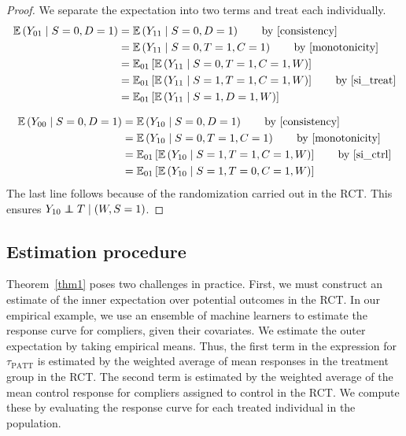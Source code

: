 \documentclass[12pt]{article}
\newcommand{\ex}{\mathbb{E}} %
\newcommand\independent{\protect\mathpalette{\protect\independenT}{\perp}}
\def\independenT#1#2{\mathrel{\rlap{$#1#2$}\mkern2mu{#1#2}}}
\begin{document}
\begin{proof}
We separate the expectation into two terms and treat each individually.
\begin{align*}
\ex\left(Y_{01} \mid S=0,D=1\right) &= \ex\left(Y_{11} \mid S=0, D=1\right) \tag*{by \eqref{consistency}} \\
&= \ex\left(Y_{11} \mid S=0, T=1, C=1\right) \tag*{by \eqref{monotonicity}} \\
&= \ex_{01}\left[  \ex\left(Y_{11} \mid S=0, T=1, C=1, W\right) \right] \\
&= \ex_{01}\left[  \ex\left(Y_{11} \mid S=1, T=1, C=1, W\right) \right] \tag*{by \eqref{si_treat}} \\
&= \ex_{01}\left[  \ex\left(Y_{11} \mid S=1, D=1, W\right)\right]
\end{align*}

\begin{align*}
\ex\left(Y_{00} \mid S=0, D=1\right) &= \ex\left(Y_{10} \mid S=0, D=1\right) \tag*{by \eqref{consistency}} \\
&= \ex\left(Y_{10} \mid S=0, T=1, C=1\right) \tag*{by \eqref{monotonicity}} \\
&= \ex_{01}\left[  \ex\left(Y_{10} \mid S=1, T=1, C=1, W\right) \right] \tag*{by \eqref{si_ctrl}} \\
&= \ex_{01}\left[  \ex\left(Y_{10} \mid S=1, T=0, C=1, W\right) \right] \\
\end{align*}
The last line follows because of the randomization carried out in the RCT.  This ensures $Y_{10} \independent T \mid (W, S=1)$.
\end{proof}

\subsection{Estimation procedure}
Theorem~\ref{thm1} poses two challenges in practice.  First, we must construct an estimate of the inner expectation over potential outcomes in the RCT.  In our empirical example, we use an ensemble of machine learners \citep{van2007} to estimate the response curve for compliers, given their covariates.  We estimate the outer expectation by taking empirical means.  Thus, the first term in the expression for $\tau_{\text{PATT}}$ is estimated by the weighted average of mean responses in the treatment group in the RCT. The second term is estimated by the weighted average of the mean control response for compliers assigned to control in the RCT.  We compute these by evaluating the response curve for each treated individual in the population.  
\end{document}
